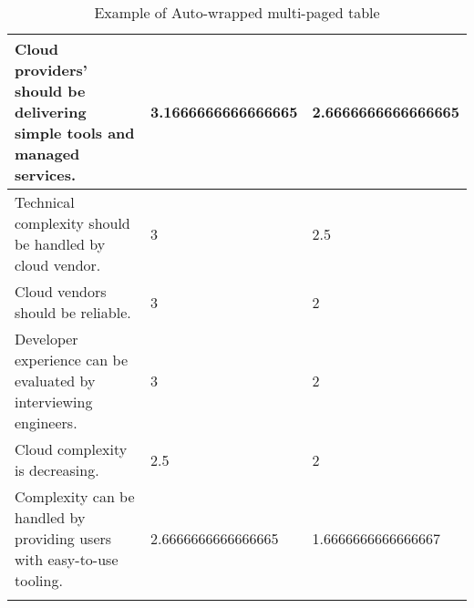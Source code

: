 \begin{longtable}{|p{10cm}|p{2cm}|p{2cm}|}
Cloud providers' should be delivering simple tools and managed services. & 3.1666666666666665 & 2.6666666666666665 \\ \hline
Technical complexity should be handled by cloud vendor. & 3 & 2.5 \\ \hline
Cloud vendors should be reliable. & 3 & 2 \\ \hline
Developer experience can be evaluated by interviewing engineers. & 3 & 2 \\ \hline
Cloud complexity is decreasing. & 2.5 & 2 \\ \hline
Complexity can be handled by providing users with easy-to-use tooling. & 2.6666666666666665 & 1.6666666666666667 \\ \hline
\caption{Example of Auto-wrapped multi-paged table}
\label{tab:table1}
\end{longtable}
